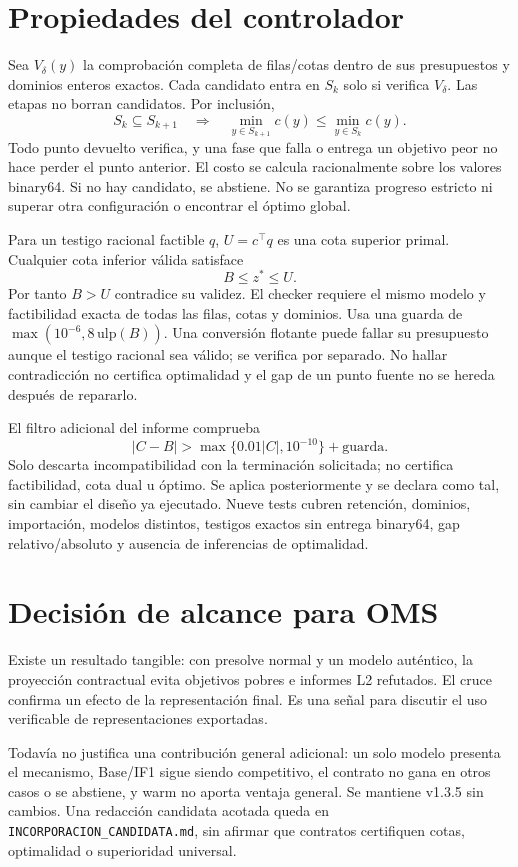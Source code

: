 \documentclass[10pt,a4paper]{article}
\begin{document}
\section*{Propiedades del controlador}
Sea $V_\delta(y)$ la comprobación completa de filas/cotas dentro de sus
presupuestos y dominios enteros exactos. Cada candidato entra en $S_k$
solo si verifica $V_\delta$. Las etapas no borran candidatos. Por inclusión,
\[
S_k\subseteq S_{k+1}\quad\Longrightarrow\quad
\min_{y\in S_{k+1}}c(y)\le\min_{y\in S_k}c(y).
\]
Todo punto devuelto verifica, y una fase que falla o entrega un objetivo peor
no hace perder el punto anterior. El costo se calcula racionalmente sobre los
valores binary64. Si no hay candidato, se abstiene. No se garantiza progreso
estricto ni superar otra configuración o encontrar el óptimo global.

Para un testigo racional factible $q$, $U=c^\top q$ es una cota superior
primal. Cualquier cota inferior válida satisface
\[
B\le z^*\le U.
\]
Por tanto $B>U$ contradice su validez. El checker requiere el mismo modelo y
factibilidad exacta de todas las filas, cotas y dominios. Usa una guarda de
$\max(10^{-6},8\,\mathrm{ulp}(B))$. Una conversión flotante puede fallar su
presupuesto aunque el testigo racional sea válido; se verifica por separado.
No hallar contradicción no certifica optimalidad y el gap de un punto fuente
no se hereda después de repararlo.

El filtro adicional del informe comprueba
\[
|C-B|>\max\{0.01|C|,10^{-10}\}+\text{guarda}.
\]
Solo descarta incompatibilidad con la terminación solicitada; no certifica
factibilidad, cota dual u óptimo. Se aplica posteriormente y se declara como
tal, sin cambiar el diseño ya ejecutado. Nueve tests cubren retención,
dominios, importación, modelos distintos, testigos exactos sin entrega
binary64, gap relativo/absoluto y ausencia de inferencias de optimalidad.
\section*{Decisión de alcance para OMS}
Existe un resultado tangible: con presolve normal y un modelo auténtico,
la proyección contractual evita objetivos pobres e informes L2 refutados.
El cruce confirma un efecto de la representación final. Es una señal para
discutir el uso verificable de representaciones exportadas.

Todavía no justifica una contribución general adicional: un solo modelo
presenta el mecanismo, Base/IF1 sigue siendo competitivo, el contrato no gana
en otros casos o se abstiene, y warm no aporta ventaja general. Se mantiene
v1.3.5 sin cambios. Una redacción candidata acotada queda en
\texttt{INCORPORACION\_CANDIDATA.md}, sin afirmar que contratos certifiquen
cotas, optimalidad o superioridad universal.
\newpage
\end{document}

